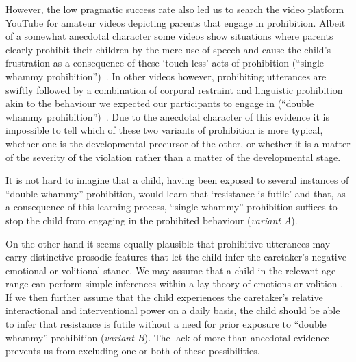 However, the low pragmatic success rate also led us to search the video platform YouTube for amateur videos depicting parents that engage in prohibition. Albeit of a 
somewhat anecdotal character some videos show situations where parents clearly prohibit their children by the mere use of speech and cause the child's 
frustration as a consequence of these `touch-less' acts of prohibition (``single whammy prohibition'')~\cite{Spivey2007}. In other videos however, prohibiting utterances are
swiftly followed by a combination of corporal restraint and linguistic prohibition akin to the behaviour we expected our participants to engage in (``double whammy
prohibition'')~\cite{DeWeerd2011}. Due to the anecdotal character of this evidence it is impossible to tell which of these two variants of prohibition is more typical, whether
one is the developmental precursor of the other, or whether it is a matter of the severity of the violation rather than a matter of the developmental stage. 

It is not hard to imagine that a child, having been exposed to several instances of ``double whammy'' prohibition, would learn that `resistance is futile' and that, as a
consequence of this learning process, ``single-whammy'' prohibition suffices to stop the child from engaging in the prohibited behaviour (\emph{variant A}). 

On the other hand it seems equally plausible that prohibitive utterances may carry distinctive prosodic features that let the child infer the caretaker's negative emotional or 
volitional stance. We may assume that a child in the relevant age range can perform simple inferences within a lay theory of emotions or volition \cite{Ong2015, Ong2018}. If
we then further assume that the child experiences the caretaker's relative interactional and interventional power on a daily basis, the child should be able to infer that
resistance is futile without a need for prior exposure to ``double whammy'' prohibition (\emph{variant B}). The lack of more than anecdotal evidence prevents us from excluding
one or both of these possibilities. 


